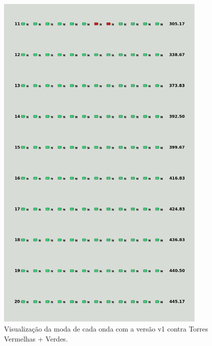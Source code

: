 \begin{figure}[H]
  \centering
  \includegraphics[width=0.9\textwidth]{figuras/td/td_redgreen_ai_mode_1_2.png}
  \caption{Visualização da moda de cada onda com a versão v1 contra Torres Vermelhas + Verdes.}
  \label{fig:td-moda-redgreen-1-2}
\end{figure}

